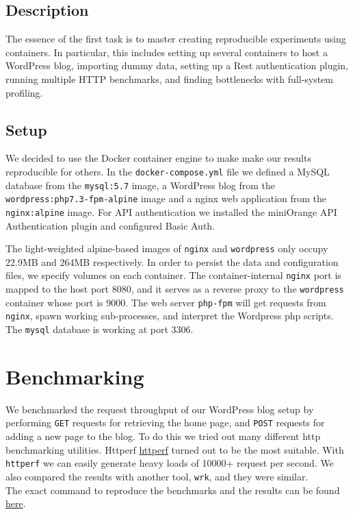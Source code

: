 \subsection{Description}

The essence of the first task is to master creating reproducible experiments using containers. In particular, this includes setting up several containers to host a WordPress blog, importing dummy data, setting up a Rest authentication plugin, running multiple HTTP benchmarks, and finding bottlenecks with full-system profiling. 

\subsection{Setup}

We decided to use the Docker container engine to make make our results reproducible for others. In the \texttt{docker-compose.yml} file we defined a MySQL database from the \texttt{mysql:5.7} image, a WordPress blog from the \texttt{wordpress:php7.3-fpm-alpine} image and a nginx web application from the \texttt{nginx:alpine} image.
For API authentication we installed the miniOrange API Authentication plugin and configured Basic Auth.

The light-weighted alpine-based images of \texttt{nginx} and \texttt{wordpress} only occupy 22.9MB and 264MB respectively. In order to persist the data and configuration files, we specify volumes on each container. The container-internal \texttt{nginx} port is mapped to the host port 8080, and it serves as a reverse proxy to the \texttt{wordpress} container whose port is 9000. The web server \texttt{php-fpm} will get requests from \texttt{nginx}, spawn working sub-processes, and interpret the Wordpress php scripts. The \texttt{mysql} database is working at port 3306.



\section{Benchmarking}

We benchmarked the request throughput of our WordPress blog setup by performing \texttt{GET} requests for retrieving the home page, and \texttt{POST} requests for adding a new page to the blog. To do this we tried out many different http benchmarking utilities. Httperf  \href{https://github.com/httperf/httperf}{httperf} turned out to be the most suitable. With \texttt{httperf} we can easily generate heavy loads of 10000+ request per second. We also compared the results with another tool, \texttt{wrk}, and they were similar.\\
The exact command to reproduce the benchmarks and the results can be found \href{https://github.com/danbachar/swiss-knife/blob/master/task1/benchmark/README.md}{here}.


